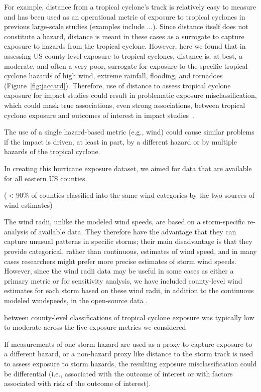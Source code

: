 For example, distance from a tropical cyclone's track is relatively easy to
measure and has been used as an operational metric of exposure to tropical
cyclones in previous large-scale studies (examples include ...). Since distance
itself does not constitute a hazard, distance is meant in these cases as a
surrogate to capture exposure to hazards from the tropical cyclone. However,
here we found that in assessing \ac{US} county-level exposure to tropical
cyclones, distance is, at best, a moderate, and often a very poor, surrogate
for exposure to the specific tropical cyclone hazards of high wind, extreme
rainfall, flooding, and tornadoes (Figure~\ref{fig:jaccard}). Therefore, use of
distance to assess tropical cyclone exposure for impact studies could result in
problematic exposure misclassification, which could mask true associations,
even strong associations, between tropical cyclone exposure and outcomes of
interest in impact studies~\parencite{savitz2016interpreting,
armstrong1998effect}.  

The use of a single hazard-based metric (e.g., wind) could cause similar
problems if the impact is driven, at least in part, by a different hazard or by
multiple hazards of the tropical cyclone.

In creating this hurricane exposure dataset, we aimed for data that are
available for all eastern \ac{US} counties.

($<$90\% of counties classified into the same wind categories by the two
sources of wind estimates)

The wind radii, unlike the modeled wind speeds, are based on a storm-specific
re-analysis of available data. They therefore have the advantage that they can
capture unusual patterns in specific storms; their main disadvantage is that
they provide categorical, rather than continuous, estimates of wind speed, and
in many cases researchers might prefer more precise estimates of storm wind
speeds. However, since the wind radii data may be useful in some cases as
either a primary metric or for sensitivity analysis, we have included
county-level wind estimates for each storm based on these wind radii, in
addition to the continuous modeled windspeeds, in the open-source data
\parencite{hurricaneexposuredata}.

between county-level classifications of tropical cyclone exposure was typically
low to moderate across the  five exposure metrics we considered 

If measurements of one storm hazard are used as a proxy to capture exposure to
a different hazard, or a non-hazard proxy like distance to the storm track is
used to assess exposure to storm hazards, the resulting exposure
misclassification could be differential (i.e., associated with the outcome of
interest or with factors associated with risk of the outcome of interest). 



